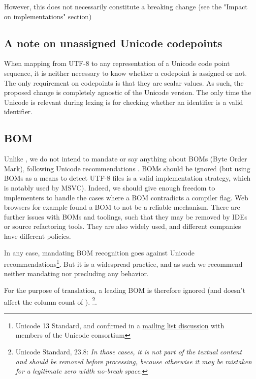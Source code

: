 \documentclass{wg21}
\begin{document}
However, this does not necessarily constitute a breaking change (see the "Impact on implementations" section)

\subsection{A note on unassigned Unicode codepoints}

When mapping from UTF-8 to any representation of a Unicode code point sequence, it is neither necessary to know
whether a codepoint is assigned or not.
The only requirement on codepoints is that they are scalar values.
As such, the proposed change is completely agnostic of the Unicode version.
The only time the Unicode is relevant during lexing is for checking whether an identifier is a valid identifier.

\subsection{BOM}

Unlike , we do not intend to mandate or say anything about BOMs (Byte Order Mark), following Unicode recommendations \cite{BOM}.
BOMs should be ignored (but using BOMs as a means to detect UTF-8 files is a valid implementation strategy, which is notably used by MSVC).
Indeed, we should give enough freedom to implementers to handle the cases where a BOM contradicts a compiler flag.
Web browsers for example found a BOM to not be a reliable mechanism.
There are further issues with BOMs and toolings, such that they may be removed by IDEs or source refactoring tools.
They are also widely used, and different companies have different policies.

In any case, mandating BOM recognition goes against Unicode recommendations\footnote{Unicode 13 Standard, and confirmed in a \href{https://corp.unicode.org/mailman/private/unicode/2020-June/008716.html}{mailing list discussion} with members of the Unicode consortium}. But it is a widespread practice, and as such we recommend neither mandating nor precluding any behavior.

\pagebreak

For the purpose of translation, a leading BOM is therefore ignored (and doesn't affect the column count of ).
\footnote{Unicode Standard, 23.8: \emph{In those cases, it is not part of the textual content and should be removed before processing, because otherwise it may be mistaken for a legitimate zero width no-break space}.}.
\end{document}
